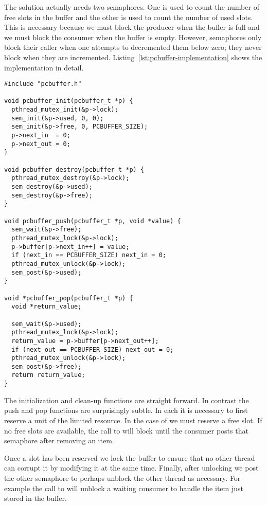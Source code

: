 The solution actually needs two semaphores. One is used to count the number of free slots in the
buffer and the other is used to count the number of used slots. This is necessary because we
must block the producer when the buffer is full and we must block the consumer when the buffer
is empty. However, semaphores only block their caller when one attempts to decremented them
below zero; they never block when they are incremented.
Listing~\ref{lst:pcbuffer-implementation} shows the implementation in detail.

\begin{lstlisting}[float=tp,frame=single,xleftmargin=0in,
  caption={Producer/Consumer Implementation},label=lst:pcbuffer-implementation]
#include "pcbuffer.h"

void pcbuffer_init(pcbuffer_t *p) {
  pthread_mutex_init(&p->lock);
  sem_init(&p->used, 0, 0);
  sem_init(&p->free, 0, PCBUFFER_SIZE);
  p->next_in  = 0;
  p->next_out = 0;
}

void pcbuffer_destroy(pcbuffer_t *p) {
  pthread_mutex_destroy(&p->lock);
  sem_destroy(&p->used);
  sem_destroy(&p->free);
}

void pcbuffer_push(pcbuffer_t *p, void *value) {
  sem_wait(&p->free);
  pthread_mutex_lock(&p->lock);
  p->buffer[p->next_in++] = value;
  if (next_in == PCBUFFER_SIZE) next_in = 0;
  pthread_mutex_unlock(&p->lock);
  sem_post(&p->used);
}

void *pcbuffer_pop(pcbuffer_t *p) {
  void *return_value;

  sem_wait(&p->used);
  pthread_mutex_lock(&p->lock);
  return_value = p->buffer[p->next_out++];
  if (next_out == PCBUFFER_SIZE) next_out = 0;
  pthread_mutex_unlock(&p->lock);
  sem_post(&p->free);
  return return_value;
}
\end{lstlisting}

The initialization and clean-up functions are straight forward. In contrast the push and pop
functions are surprisingly subtle. In each it is necessary to first reserve a unit of the
limited resource. In the case of  we must reserve a free slot. If no
free slots are available, the call to  will block until the
consumer posts that semaphore after removing an item.

Once a slot has been reserved we lock the buffer to ensure that no other thread can corrupt it
by modifying it at the same time. Finally, after unlocking we post the other semaphore to
perhaps unblock the other thread as necessary. For example the call to
 will unblock a waiting consumer to handle the item just stored
in the buffer.

